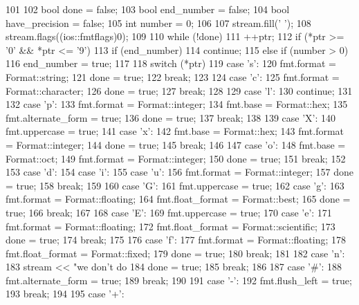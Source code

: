 \begin{DoxyCode}
101 {
102     bool done = false;
103     bool end_number = false;
104     bool have_precision = false;
105     int number = 0;
106 
107     stream.fill(' ');
108     stream.flags((ios::fmtflags)0);
109 
110     while (!done) {
111         ++ptr;
112         if (*ptr >= '0' && *ptr <= '9') {
113             if (end_number)
114                 continue;
115         } else if (number > 0)
116             end_number = true;
117 
118         switch (*ptr) {
119           case 's':
120             fmt.format = Format::string;
121             done = true;
122             break;
123 
124           case 'c':
125             fmt.format = Format::character;
126             done = true;
127             break;
128 
129           case 'l':
130             continue;
131 
132           case 'p':
133             fmt.format = Format::integer;
134             fmt.base = Format::hex;
135             fmt.alternate_form = true;
136             done = true;
137             break;
138 
139           case 'X':
140             fmt.uppercase = true;
141           case 'x':
142             fmt.base = Format::hex;
143             fmt.format = Format::integer;
144             done = true;
145             break;
146 
147           case 'o':
148             fmt.base = Format::oct;
149             fmt.format = Format::integer;
150             done = true;
151             break;
152 
153           case 'd':
154           case 'i':
155           case 'u':
156             fmt.format = Format::integer;
157             done = true;
158             break;
159 
160           case 'G':
161             fmt.uppercase = true;
162           case 'g':
163             fmt.format = Format::floating;
164             fmt.float_format = Format::best;
165             done = true;
166             break;
167 
168           case 'E':
169             fmt.uppercase = true;
170           case 'e':
171             fmt.format = Format::floating;
172             fmt.float_format = Format::scientific;
173             done = true;
174             break;
175 
176           case 'f':
177             fmt.format = Format::floating;
178             fmt.float_format = Format::fixed;
179             done = true;
180             break;
181 
182           case 'n':
183             stream << "we don't do %
184             done = true;
185             break;
186 
187           case '#':
188             fmt.alternate_form = true;
189             break;
190 
191           case '-':
192             fmt.flush_left = true;
193             break;
194 
195           case '+':
}}}
\end{DoxyCode}
